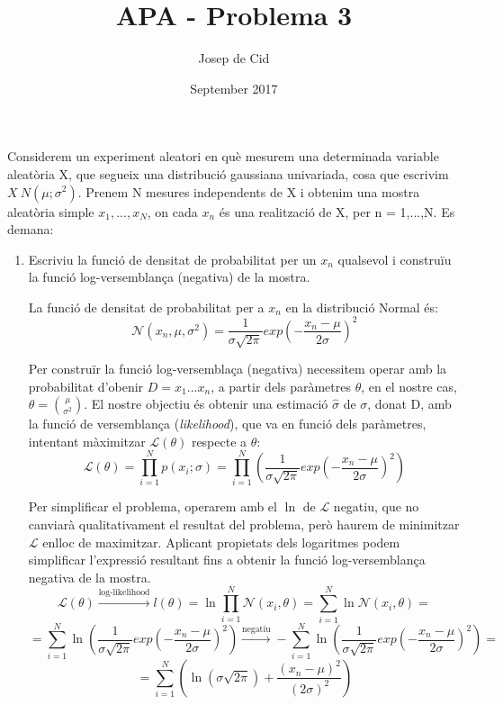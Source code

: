 \documentclass{article}
\title{APA - Problema 3}
\author{Josep de Cid}
\date{September 2017}
\begin{document}
\maketitle

Considerem un experiment aleatori en què mesurem una determinada variable aleatòria X, que segueix una distribució gaussiana univariada, cosa que escrivim $X ~ N(\mu; \sigma^2)$. Prenem N mesures independents de X i obtenim una mostra aleatòria simple ${x_1, ...,x_N}$, on cada $x_n$ és una realització de X, per n = 1,...,N. Es demana:

\begin{enumerate}
    \item Escriviu la funció de densitat de probabilitat per un $x_n$ qualsevol i construïu la funció log-versemblança (negativa) de la mostra.\newline
    
    La funció de densitat de probabilitat per a $x_n$ en la distribució Normal és:
    \[\mathcal{N}(x_n, \mu, \sigma^2) = \frac{1}{\sigma\sqrt{2\pi}}exp(-\frac{x_n - \mu}{2\sigma})^2\]
    
    Per construïr la funció log-versemblaça (negativa) necessitem operar amb la probabilitat d'obenir $D = {x_1...x_n}$, a partir dels paràmetres $\theta$, en el nostre cas, $\theta = \binom{\mu}{\sigma^2}$. El nostre objectiu és obtenir una estimació $\hat{\sigma}$ de $\sigma$, donat D, amb la funció de versemblança (\textit{likelihood}), que va en funció dels paràmetres, intentant màximitzar $\mathcal{L}(\theta)$ respecte a $\theta$:
    \[\mathcal{L}(\theta) = \prod_{i=1}^{N} p(x_i;\sigma) = \prod_{i=1}^{N} (\frac{1}{\sigma\sqrt{2\pi}}exp(-\frac{x_n - \mu}{2\sigma})^2)\]
    
    Per simplificar el problema, operarem amb el $\ln$ de $\mathcal{L}$ negatiu, que no canviarà qualitativament el resultat del problema, però haurem de minimitzar $\mathcal{L}$ enlloc de maximitzar. Aplicant propietats dels logaritmes podem simplificar l'expressió resultant fins a obtenir la funció log-versemblança negativa de la mostra.
    \[\mathcal{L}(\theta)\xrightarrow[]{\text{log-likelihood}}l(\theta) = \ln\prod_{i=1}^{N} \mathcal{N}(x_i, \theta) = \sum_{i=1}^{N} \ln\mathcal{N}(x_i, \theta) =\]
    \[= \sum_{i=1}^{N} \ln(\frac{1}{\sigma\sqrt{2\pi}}exp(-\frac{x_n - \mu}{2\sigma})^2) \xrightarrow[]{\text{negatiu}} -\sum_{i=1}^{N} \ln(\frac{1}{\sigma\sqrt{2\pi}}exp(-\frac{x_n - \mu}{2\sigma})^2) =\]
    \[= \sum_{i=1}^{N} (\ln(\sigma\sqrt{2\pi}) + \frac{(x_n - \mu)^2}{(2\sigma)^2})\]
        

\end{enumerate}
\end{document}
